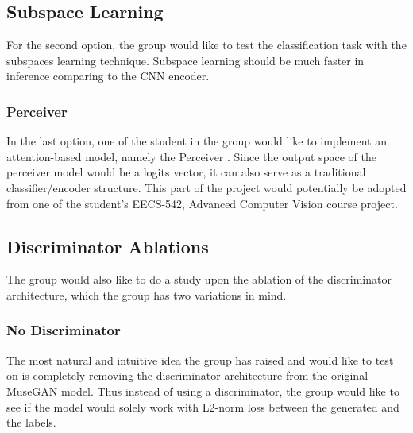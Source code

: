 \begin{par}
        \subsection{Subspace Learning} %
        \label{ssub:Subspace Learning}
            \par For the second option, the group would like to test the classification task with the subspaces learning technique. Subspace learning should be much faster in inference comparing to the CNN encoder. 

        \subsubsection{Perceiver} %
        \label{ssub:Perceiver}
            \par In the last option, one of the student in the group would like to implement an attention-based model, namely the Perceiver \cite{perceiver}. Since the output space of the perceiver model would be a logits vector, it can also serve as a traditional classifier/encoder structure. This part of the project would potentially be adopted from one of the student's EECS-542, Advanced Computer Vision course project. 

    \subsection{Discriminator Ablations} %
    \label{sub:Discriminator Ablations}
        \par The group would also like to do a study upon the ablation of the discriminator architecture, which the group has two variations in mind. 

        \subsubsection{No Discriminator} %
        \label{ssub:No Discriminator}
            \par The most natural and intuitive idea the group has raised and would like to test on is completely removing the discriminator architecture from the original MuseGAN model. Thus instead of using a discriminator, the group would like to see if the model would solely work with L2-norm loss between the generated and the labels.
            


\end{par}

